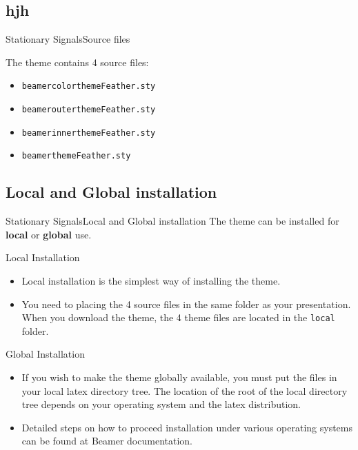 \documentclass[10pt]{beamer}
\begin{document}
\subsection{hjh}
\begin{frame}{Stationary Signals}{Source files}

\begin{block}{}
The theme contains 4 source files:
  \begin{itemize}
    \item {\tt beamercolorthemeFeather.sty}
    \item {\tt beamerouterthemeFeather.sty}
    \item {\tt beamerinnerthemeFeather.sty}
    \item {\tt beamerthemeFeather.sty}
  \end{itemize}
\end{block}
\end{frame}

\subsection{Local and Global installation}
\begin{frame}{Stationary Signals}{Local and Global installation}
  The theme can be installed for \textbf{local} or \textbf{global} use.
  \begin{block}{Local Installation}
  \begin{itemize}    
    \item Local installation is the simplest way of installing the theme. 
    \item You need to placing the 4 source files in the same folder as your presentation. When you download the theme, the 4 theme files are located in the {\tt local} folder.
  \end{itemize}
  \end{block}

  \begin{block}{Global Installation}
  \begin{itemize}
     \item If you wish to make the theme globally available, you must put the files in your local latex directory tree. The location of the root of the local directory tree depends on your operating system and the latex distribution. 
     \item Detailed steps on how to proceed installation under various operating systems can be found at Beamer documentation.
  \end{itemize}
  \end{block}
\end{frame}
     
\end{document}
